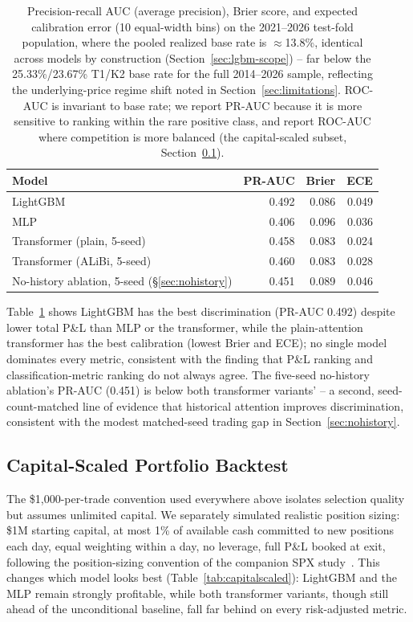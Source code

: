 \documentclass[sigconf,review]{acmart}
\begin{document}
\begin{table}[t]
\footnotesize
\begin{tabular}{lrrr}
\toprule
Model & PR-AUC & Brier & ECE \\
\midrule
LightGBM & 0.492 & 0.086 & 0.049 \\
MLP & 0.406 & 0.096 & 0.036 \\
Transformer (plain, 5-seed) & 0.458 & 0.083 & 0.024 \\
Transformer (ALiBi, 5-seed) & 0.460 & 0.083 & 0.028 \\
No-history ablation, 5-seed (\S\ref{sec:nohistory}) & 0.451 & 0.089 & 0.046 \\
\bottomrule
\end{tabular}
\caption{Precision-recall AUC (average precision), Brier score, and expected calibration error (10 equal-width bins) on the 2021--2026 test-fold population, where the pooled realized base rate is $\approx$13.8\%, identical across models by construction (Section~\ref{sec:lgbm-scope}) -- far below the 25.33\%/23.67\% T1/K2 base rate for the full 2014--2026 sample, reflecting the underlying-price regime shift noted in Section~\ref{sec:limitations}. ROC-AUC is invariant to base rate; we report PR-AUC because it is more sensitive to ranking within the rare positive class, and report ROC-AUC where competition is more balanced (the capital-scaled subset, Section~\ref{sec:capitalscaled}).}
\label{tab:calibration}
\end{table}

Table~\ref{tab:calibration} shows LightGBM has the best discrimination (PR-AUC 0.492) despite lower total P\&L than MLP or the transformer, while the plain-attention transformer has the best calibration (lowest Brier and ECE); no single model dominates every metric, consistent with the finding that P\&L ranking and classification-metric ranking do not always agree. The five-seed no-history ablation's PR-AUC (0.451) is below both transformer variants' -- a second, seed-count-matched line of evidence that historical attention improves discrimination, consistent with the modest matched-seed trading gap in Section~\ref{sec:nohistory}.

\subsection{Capital-Scaled Portfolio Backtest}
\label{sec:capitalscaled}
The \$1,000-per-trade convention used everywhere above isolates selection quality but assumes unlimited capital. We separately simulated realistic position sizing: \$1M starting capital, at most 1\% of available cash committed to new positions each day, equal weighting within a day, no leverage, full P\&L booked at exit, following the position-sizing convention of the companion SPX study~\cite{glasserman2025tp2}. This changes which model looks best (Table~\ref{tab:capitalscaled}): LightGBM and the MLP remain strongly profitable, while both transformer variants, though still ahead of the unconditional baseline, fall far behind on every risk-adjusted metric.
\end{document}
